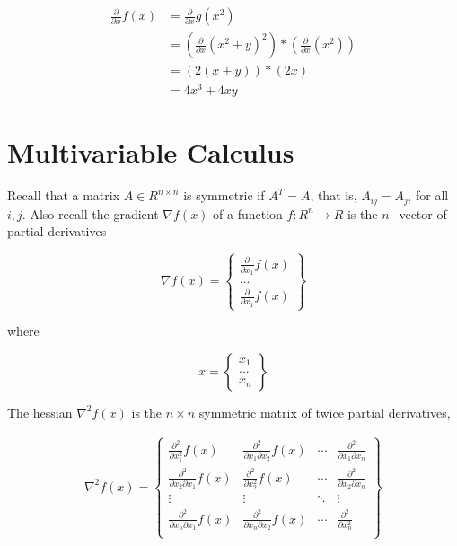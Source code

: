 \documentclass[11pt]{article}
\begin{document}
    \[\begin{aligned}
\frac{\partial}{\partial x}f(x) &= \frac{\partial}{\partial x} g(x^2) \\
                                &= (\frac{\partial}{\partial x} (x^2+y)^2 )*(\frac{\partial}{\partial x} (x^2))\\
                                &= (2(x+y))*(2x) \\
                                &= 4x^3 + 4xy
\end{aligned}\]

    \hypertarget{multivariable-calculus}{%
\section{Multivariable Calculus}\label{multivariable-calculus}}

Recall that a matrix \(A \in R^{n\times n}\) is symmetric if
\(A^T = A\), that is, \(A_{ij} = A_{ji}\) for all \(i, j\). Also recall
the gradient \(\nabla f(x)\) of a function \(f : R^n → R\) is the
\(n\)−vector of partial derivatives

\[
\nabla f(x) = \left\{
\begin{matrix}
    \frac{\partial}{\partial x_1}f(x) \\
    ... \\
    \frac{\partial}{\partial x_1}f(x)
    \end{matrix}
\right\}
\]

where

\[
x = \left\{
\begin{matrix}
    x_1 \\
    ... \\
    x_n
\end{matrix}
\right\}
\]

The hessian \(\nabla^2 f(x)\) is the \(n\times n\) symmetric matrix of
twice partial derivatives,

\[\begin{aligned}
\nabla^2f(x) = \left\{
\begin{matrix}
    \frac{\partial^2}{\partial x_1^2}f(x) & \frac{\partial^2}{\partial x_1 \partial x_2}f(x) & \cdots & \frac{\partial^2}{\partial x_1 \partial x_n} \\
    \frac{\partial^2}{\partial x_2 \partial x_1}f(x) & \frac{\partial^2}{\partial x_2^2}f(x) & \cdots & \frac{\partial^2}{\partial x_2 \partial x_n} \\
    \vdots & \vdots & \ddots & \vdots \\
    \frac{\partial^2}{\partial x_n \partial x_1}f(x) & \frac{\partial^2}{\partial x_n \partial x_2}f(x) & \cdots & \frac{\partial^2}{\partial x_n^2} \\
\end{matrix}
\right\}
\end{aligned}\]
\end{document}
